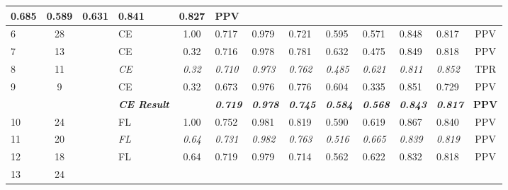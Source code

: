 \begin{table}[H]
{\begin{tabular}{lcc|l|c|l|l|l|l|l|l|l|c|}
    0.685 &
    0.589 &
    0.631 &
    0.841 &
    0.827 &
    PPV \\ \hline
  \multicolumn{1}{|l|}{6} &
    \multicolumn{1}{c|}{28} &
    \cellcolor[HTML]{6638B6}{\color[HTML]{FFFFFF} DB} &
    CE &
    1.00 &
    0.717 &
    0.979 &
    0.721 &
    0.595 &
    0.571 &
    0.848 &
    0.817 &
    PPV \\ \hline
  \multicolumn{1}{|l|}{7} &
    \multicolumn{1}{c|}{13} &
    \cellcolor[HTML]{6638B6}{\color[HTML]{FFFFFF} DB} &
    CE &
    0.32 &
    0.716 &
    0.978 &
    0.781 &
    0.632 &
    0.475 &
    0.849 &
    0.818 &
    PPV \\ \hline
  \multicolumn{1}{|l|}{8} &
    \multicolumn{1}{c|}{11} &
    \cellcolor[HTML]{6638B6}{\color[HTML]{FFFFFF} DB} &
    \textit{CE} &
    \textit{0.32} &
    \textit{0.710} &
    \textit{0.973} &
    \textit{0.762} &
    \textit{0.485} &
    \textit{0.621} &
    \textit{0.811} &
    \textit{0.852} &
    TPR \\ \hline
  \multicolumn{1}{|l|}{9} &
    \multicolumn{1}{c|}{9} &
    \cellcolor[HTML]{6638B6}{\color[HTML]{FFFFFF} DB} &
    CE &
    0.32 &
    0.673 &
    0.976 &
    0.776 &
    0.604 &
    0.335 &
    0.851 &
    0.729 &
    PPV \\ \hline
   &
     &
     &
    \textit{\textbf{CE Result}} &
     &
    \textit{\textbf{0.719}} &
    \textit{\textbf{0.978}} &
    \textit{\textbf{0.745}} &
    \textit{\textbf{0.584}} &
    \textit{\textbf{0.568}} &
    \textit{\textbf{0.843}} &
    \textit{\textbf{0.817}} &
    \textbf{PPV} \\ \hline
  \multicolumn{1}{|l|}{10} &
    \multicolumn{1}{c|}{24} &
    \cellcolor[HTML]{6638B6}{\color[HTML]{FFFFFF} DB} &
    FL &
    1.00 &
    0.752 &
    0.981 &
    0.819 &
    0.590 &
    0.619 &
    0.867 &
    0.840 &
    PPV \\ \hline
  \multicolumn{1}{|l|}{11} &
    \multicolumn{1}{c|}{20} &
    \cellcolor[HTML]{6638B6}{\color[HTML]{FFFFFF} DB} &
    \textit{FL} &
    \textit{0.64} &
    \textit{0.731} &
    \textit{0.982} &
    \textit{0.763} &
    \textit{0.516} &
    \textit{0.665} &
    \textit{0.839} &
    \textit{0.819} &
    PPV \\ \hline
  \multicolumn{1}{|l|}{12} &
    \multicolumn{1}{c|}{18} &
    \cellcolor[HTML]{6638B6}{\color[HTML]{FFFFFF} DB} &
    FL &
    0.64 &
    0.719 &
    0.979 &
    0.714 &
    0.562 &
    0.622 &
    0.832 &
    0.818 &
    PPV \\ \hline
  \multicolumn{1}{|l|}{13} &
    \multicolumn{1}{c|}{24} &

\end{tabular}}
\end{table}
